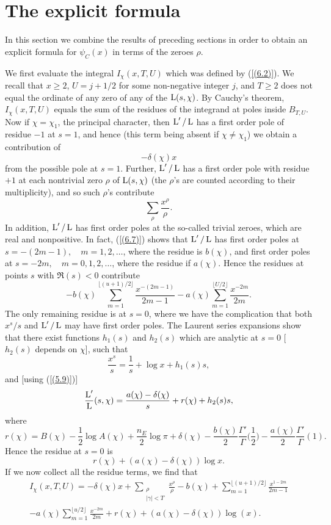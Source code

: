 \documentclass[./main]{subfiles}
\begin{document}
\section{The explicit formula}
In this section we combine the results of preceding sections in order to obtain an explicit formula for $\psi_C(x)$ in terms of the zeroes $\rho$. 

We first evaluate the integral $I_{\chi}(x,T,U)$ which was defined by (\ref{(6.2)}). We recall that $x \geq 2$, $U = j + 1/2$ for some non-negative integer $j$, and $T \geq 2$ does not equal the ordinate of any zero of any of the $\operatorname{L}(s, \chi)$. By Cauchy's theorem, $I_{\chi}(x,T,U)$ equals the sum of the residues of the integrand at poles inside $B_{T,U}$. Now if $\chi = \chi_1$, the principal character, then $\operatorname{L}'/\operatorname{L}$ has a first order pole of residue $-1$ at $s=1$, and hence (this term being absent if $\chi \neq \chi_1$) we obtain a contribution of 
\[ -\delta(\chi)x
\]
from the possible pole at $s=1$. Further, $\operatorname{L}'/\operatorname{L}$ has a first order pole with residue $+1$ at each nontrivial zero $\rho$ of $\operatorname{L}(s, \chi)$ (the $\rho$'s are counted according to their multiplicity), and so such $\rho$'s contribute
\[ \sum_{\rho} \frac{x^{\rho}}{\rho}.
\]
In addition, $\operatorname{L}'/\operatorname{L}$ has first order poles at the so-called trivial zeroes, which are real and nonpositive. In fact, (\ref{(6.7)}) shows that $\operatorname{L}'/\operatorname{L}$ has first order poles at $s = -(2m-1),\quad m=1,2,\dots$, where the residue is $b(\chi)$, and first order poles at $s=-2m,\quad m=0,1,2,\dots$, where the residue if $a(\chi)$. Hence the residues at points $s$ with $\Re(s) < 0$ contribute 
\[ -b(\chi) \sum_{m=1}^{\lfloor(u+1)/2\rfloor} \frac{x^{-(2m-1)}}{2m-1} - a(\chi) \sum_{m=1}^{\lfloor U/2\rfloor} \frac{x^{-2m}}{2m}.
\]
The only remaining residue is at $s=0$, where we have the complication that both $x^s/s$ and $\operatorname{L}'/\operatorname{L}$ may have first order poles. The Laurent series expansions show that there exist functions $h_1(s)$ and $h_2(s)$ which are analytic at $s=0$ [$h_2(s)$ depends on $\chi$], such that 
\[ \frac{x^s}{s} = \frac{1}{s} + \log x + h_1(s)s,
\]
and [using (\ref{(5.9)})]
\[ \frac{\operatorname{L}'}{\operatorname{L}}(s, \chi) = \frac{a(\chi) - \delta(\chi)}{s} + r(\chi) +  h_2(s)s,
\]
where 
\[\tag{7.1}\label{(7.1)} r(\chi) = B(\chi) - \frac{1}{2} \log A(\chi) + \frac{n_E}{2} \log\pi + \delta(\chi) - \frac{b(\chi)}{2}\frac{\Gamma'}{\Gamma}\Big(\frac{1}{2}\Big) - \frac{a(\chi)}{2}\frac{\Gamma'}{\Gamma}(1).\quad
\]
Hence the residue at $s=0$ is 
\[ r(\chi) + (a(\chi) - \delta(\chi)) \log x
.\]
If we now collect all the residue terms, we find that 
\begin{multline}\tag{7.2}\label{(7.2)} I_{\chi}(x,T,U) = - \delta(\chi)x + \sum_{\substack{\rho \\ |\gamma| < T}} \frac{x^{\rho}}{\rho} - b(\chi) + \sum_{m=1}^{\lfloor (u+1)/2\rfloor} \frac{x^{1-2m}}{2m-1} \\- a(\chi) \sum_{m=1}^{\lfloor u/2\rfloor} \frac{x^{-2m}}{2m} + r(\chi) + (a(\chi) - \delta(\chi)) \log(x).
\end{multline}
\end{document}

